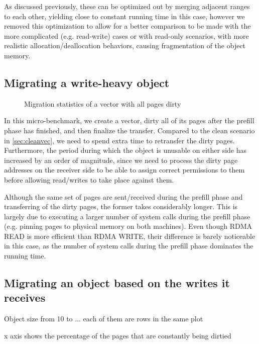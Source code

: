 As discussed previously, these can be optimized out by
merging adjacent ranges to each other, yielding close to constant running time
in this case, however we removed this optimization to allow for a better
comparison to be made with the more complicated (e.g. read-write) cases or
with read-only scenarios,
with more realistic allocation/deallocation behaviors, causing fragmentation
of the object memory.

\subsection{Migrating a write-heavy object}
\begin{figure}[tp]
    \begin{center}
        
    \end{center}
    \caption{Migration statistics of a vector with all pages dirty}
    \label{fig:vectorwriteall}
\end{figure}

In this micro-benchmark, we create a vector, dirty all of its pages after the
prefill phase has finished, and then finalize the transfer. Compared to the
clean scenario in \autoref{sec:cleanvec}, we need to spend extra time to
retransfer the dirty pages. Furthermore, the period during which the object is
unusable on either side has increased by an order of magnitude, since we need to
process the dirty page addresses on the receiver side to be able to assign
correct permissions to them before allowing read/writes to take place against
them.

Although the same set of pages are sent/received during the prefill phase and
transferring of the dirty pages, the former takes considerably longer. This is
largely due to executing a larger number of system calls during the prefill
phase (e.g. pinning pages to physical memory on both machines). Even though
RDMA READ is more efficient than RDMA WRITE, their difference is barely
noticeable in this case, as the number of system calls during the prefill phase
dominates the running time.


\subsection{Migrating an object based on the writes it receives}
Object size from 10 to ... each of them are rows in the same plot

x axis shows the percentage of the pages that are constantly being dirtied

